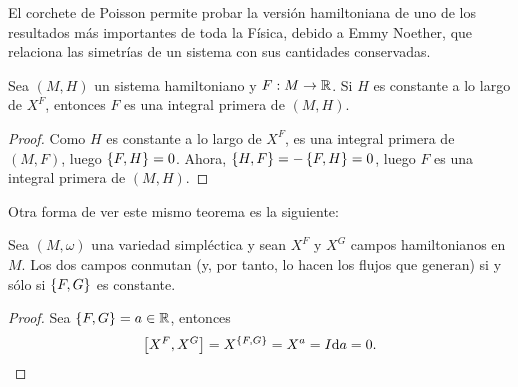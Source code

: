   El corchete de Poisson permite probar la versión hamiltoniana de uno de los resultados más importantes de toda la Física, debido a Emmy Noether, que relaciona las simetrías de un sistema con sus cantidades conservadas.
  \begin{prop}
    Sea $(M,H)$ un sistema hamiltoniano y $F:M \rightarrow \mathbb{R}$. Si $H$ es constante a lo largo de $X^F$, entonces $F$ es una integral primera de $(M,H)$. 
  \end{prop}
  \begin{proof}
    Como $H$ es constante a lo largo de $X^F$, es una integral primera de $(M,F)$, luego $\left\lbrace F,H\right\rbrace=0$. Ahora, $\left\lbrace H,F\right\rbrace=-\left\lbrace F,H\right\rbrace=0$, luego $F$ es una integral primera de $(M,H)$. 
  \end{proof}
Otra forma de ver este mismo teorema es la siguiente:
\begin{prop}
  Sea $(M,\omega)$ una variedad simpléctica y sean $X^F$ y $X^G$ campos hamiltonianos en $M$. Los dos campos conmutan (y, por tanto, lo hacen los flujos que generan) si y sólo si $\left\lbrace F,G\right\rbrace$ es constante. 
\end{prop}
\begin{proof}
  Sea $\left\lbrace F,G\right\rbrace=a \in \mathbb{R}$, entonces
  \begin{equation*}
    \left[X^F,X^G\right]= X^{\left\lbrace F,G\right\rbrace} = X^a = I \mathrm{d} a =0.
  \end{equation*}
\end{proof}

